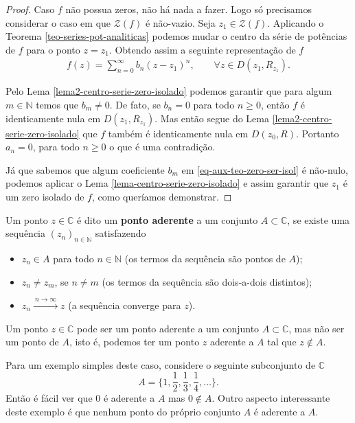 \begin{proof}
Caso $f$ não possua zeros, não há nada a fazer. 
Logo só precisamos considerar o caso em que $\mathcal{Z}(f)$ é não-vazio. 
Seja $z_1\in\mathcal{Z}(f)$. Aplicando o Teorema \ref{teo-series-pot-analiticas}
podemos mudar o centro da série de potências de $f$ para o ponto $z=z_1$.
Obtendo assim a seguinte representação de $f$
\begin{align}\label{eq-aux-teo-zero-ser-isol}
f(z)
=
\sum_{n=0}^{\infty} b_n(z-z_1)^{n}, \qquad \forall z\in D(z_1,R_{z_1}).
\end{align}

Pelo Lema \ref{lema2-centro-serie-zero-isolado} podemos garantir 
que para algum $m\in\mathbb{N}$ temos que $b_m\neq 0$. 
De fato, se $b_n=0$ para todo $n\geqslant 0$, então $f$ é identicamente nula em $D(z_1,R_{z_1})$. Mas então segue do
Lema \ref{lema2-centro-serie-zero-isolado} que $f$ também é identicamente nula em 
$D(z_0,R)$. Portanto $a_n=0$, para todo $n\geqslant 0$ o que é uma contradição.

Já que sabemos que algum coeficiente $b_m$ em \eqref{eq-aux-teo-zero-ser-isol} é não-nulo, 
podemos aplicar o Lema \ref{lema-centro-serie-zero-isolado} e assim
garantir que $z_1$ é um zero isolado de $f$, como queríamos demonstrar.
\end{proof}


\bigskip 

\begin{definicao}
\label{def-ponto-aderencia}
Um ponto $z\in\mathbb{C}$ é dito um \textbf{ponto aderente} a um
conjunto $A\subset \mathbb{C}$, se existe uma sequência 
$(z_n)_{n\in\mathbb{N}}$ satisfazendo 
\begin{itemize}
\item $z_n\in A$ para todo $n\in\mathbb{N}$ (os termos da sequência são pontos de $A$);
\item $z_n\neq z_m$, se $n\neq m$ (os termos da sequência são dois-a-dois distintos);
\item $z_n\xrightarrow{\ n\to\infty\ } z$ (a sequência converge para $z$).
\end{itemize}
\end{definicao}



\begin{observacao}
Um ponto $z\in\mathbb{C}$ pode ser um ponto aderente a um conjunto 
$A\subset\mathbb{C}$, mas não ser um ponto de $A$, isto é, podemos
ter um ponto $z$ aderente a $A$ tal que $z\notin A$.

Para um exemplo simples deste caso, considere o seguinte subconjunto de $\mathbb{C}$
\[
A = \Big\{1,\frac{1}{2}, \frac{1}{3}, \frac{1}{4},\ldots\Big\}.
\]
Então é fácil ver que $0$ é aderente a $A$ mas $0\notin A$.
Outro aspecto interessante deste exemplo é que nenhum ponto do
próprio conjunto $A$ é aderente a $A$. 
\end{observacao}

